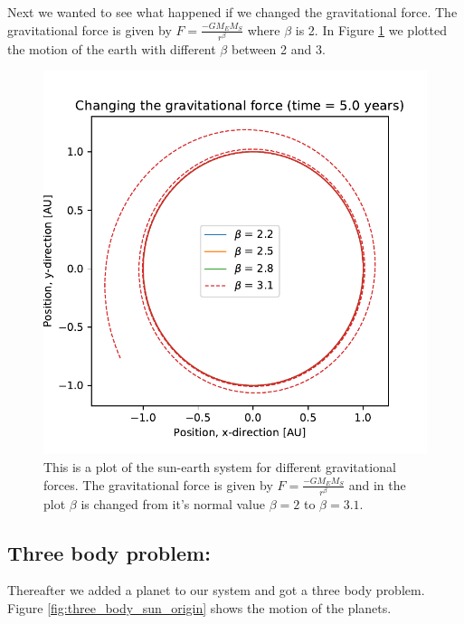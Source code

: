 Next we wanted to see what happened if we changed the gravitational force. The gravitational force is given by $ F = \frac{-GM_EM_S}{r^\beta}$ where $\beta$ is 2. In Figure \ref{fig:different_gravitation} we plotted the motion of the earth with different $\beta$ between 2 and 3.

\begin{figure}[H]
\includegraphics[width=0.9\linewidth]{../results/plots/diffenrent_gravitation.pdf}\caption{This is a plot of the sun-earth system for different gravitational forces. The gravitational force is given by $ F = \frac{-GM_EM_S}{r^\beta}$ and in the plot $\beta$ is changed from it's normal value $\beta = 2$ to $\beta = 3.1$.}\label{fig:different_gravitation}
\end{figure}

\subsection{Three body problem:}

Thereafter we added a planet to our system and got a three body problem. Figure \ref{fig:three_body_sun_origin} shows the motion of the planets.

